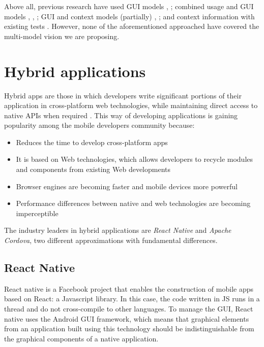 
Above all, previous research have used GUI models  \cite{monkeylab}, \cite{aimDroid}; combined usage  and GUI models \cite{mao_harman_jia_2016}, \cite{amalfitano_fasolino_tramontana_ta_memon_2015}, \cite{Li:ICSE17}; GUI and context models (partially)  \cite{crashscope}, \cite{Liang:MobiCom14}; and context information with existing tests \cite{Adamsen:ISSTA2015}. However, none of the aforementioned approached have covered the multi-model vision we are proposing.

\section{Hybrid applications}

Hybrid apps are those in which developers write significant portions of their application in cross-platform web technologies, while maintaining direct access to native APIs when required \cite{ibmHybrid}. This way of developing applications is gaining popularity among the mobile developers community because:
\begin{itemize}
	\item Reduces the time to develop cross-platform apps
	\item It is based on Web technologies, which allows developers to recycle modules and components from existing Web developments
	\item Browser engines are becoming faster and mobile devices more powerful
	\item Performance differences between native and web technologies are becoming imperceptible
\end{itemize}
The industry leaders in hybrid applications are \textit{React Native} and \textit{Apache Cordova}, two different approximations with fundamental differences.
\subsection{React Native}
React native is a Facebook project that enables the construction of mobile apps based on React: a Javascript library. In this case, the code written in JS runs in a thread and do not cross-compile to other languages. To manage the GUI, React native uses the Android GUI framework, which means that graphical elements from an application built using this technology should be indistinguishable from the graphical components of a native application. 

